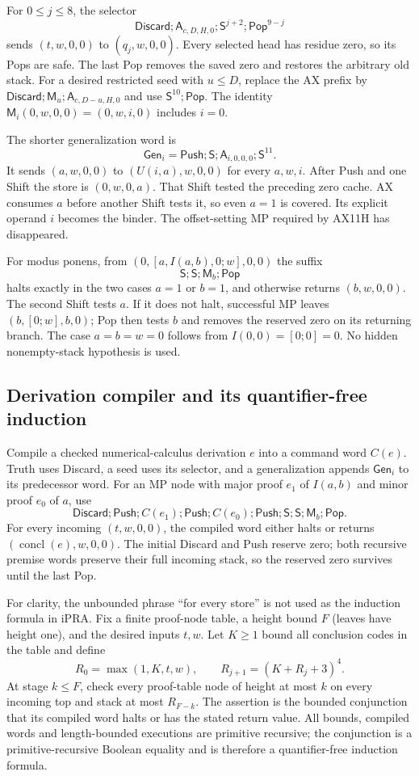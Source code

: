 For $0\le j\le8$, the selector
\[
 \mathsf{Discard};\mathsf A_{c,D,H,0};\mathsf S^{j+2};
 \mathsf{Pop}^{9-j}
\]
sends $(t,w,0,0)$ to $(q_j,w,0,0)$. Every selected head has residue zero,
so its Pops are safe. The last Pop removes the saved zero and restores
the arbitrary old stack. For a desired restricted seed with $u\le D$,
replace the AX prefix by
$\mathsf{Discard};\mathsf M_u;\mathsf A_{c,D-u,H,0}$ and use
$\mathsf S^{10};\mathsf{Pop}$. The identity
$\mathsf M_i(0,w,0,0)=(0,w,i,0)$ includes $i=0$.

The shorter generalization word is
\[
 \boxed{\mathsf{Gen}_i=
 \mathsf{Push};\mathsf S;\mathsf A_{i,0,0,0};\mathsf S^{11}.}
\]
It sends $(a,w,0,0)$ to $(U(i,a),w,0,0)$ for every $a,w,i$.
After Push and one Shift the store is $(0,w,0,a)$. That Shift tested
the preceding zero cache. AX consumes $a$ before another Shift tests it,
so even $a=1$ is covered. Its explicit operand $i$ becomes the binder.
The offset-setting MP required by AX11H has disappeared.

For modus ponens, from $(0,[a,I(a,b),0;w],0,0)$ the suffix
\[
 \mathsf S;\mathsf S;\mathsf M_b;\mathsf{Pop}
\]
halts exactly in the two cases $a=1$ or $b=1$, and otherwise returns
$(b,w,0,0)$. The second Shift tests $a$. If it does not halt, successful
MP leaves $(b,[0;w],b,0)$; Pop then tests $b$ and removes the reserved
zero on its returning branch. The case $a=b=w=0$ follows from
$I(0,0)=[0;0]=0$. No hidden nonempty-stack hypothesis is used.

\subsection{Derivation compiler and its quantifier-free induction}

Compile a checked numerical-calculus derivation $e$ into a command word
$C(e)$. Truth uses Discard, a seed uses its selector, and a generalization
appends $\mathsf{Gen}_i$ to its predecessor word. For an MP node with
major proof $e_1$ of $I(a,b)$ and minor proof $e_0$ of $a$, use
\[
 \mathsf{Discard};\mathsf{Push};C(e_1);\mathsf{Push};
 C(e_0);\mathsf{Push};\mathsf S;\mathsf S;\mathsf M_b;\mathsf{Pop}.
\]
For every incoming $(t,w,0,0)$, the compiled word either halts or
returns $(\operatorname{concl}(e),w,0,0)$. The initial Discard and Push
reserve zero; both recursive premise words preserve their full incoming
stack, so the reserved zero survives until the last Pop.

For clarity, the unbounded phrase ``for every store'' is not used as
the induction formula in iPRA. Fix a finite proof-node table, a height
bound $F$ (leaves have height one), and the desired inputs $t,w$. Let
$K\ge1$ bound all conclusion codes in the table and define
\[
 R_0=\max(1,K,t,w),\qquad R_{j+1}=(K+R_j+3)^4.
\]
At stage $k\le F$, check every proof-table node of height at most $k$
on every incoming top and stack at most $R_{F-k}$. The assertion is
the bounded conjunction that its compiled word halts or has the stated
return value. All bounds, compiled words and length-bounded executions
are primitive recursive; the conjunction is a primitive-recursive
Boolean equality and is therefore a quantifier-free induction formula.

